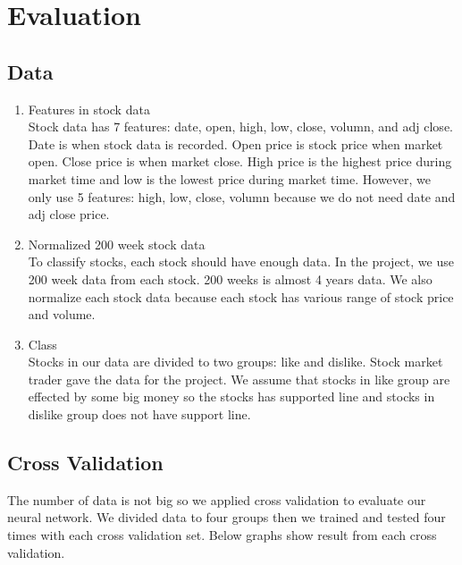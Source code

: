 \documentclass[12pt]{article}
\begin{document}
\section{Evaluation}
\subsection{Data}
\begin{enumerate}
	\item Features in stock data\\
		Stock data has 7 features: date, open, high, low, close, volumn, and adj close. Date is when stock data is recorded. Open price is stock price when market open. Close price is when market close. High price is the highest price during market time and low is the lowest price during market time. However, we only use 5 features: high, low, close, volumn because we do not need date and adj close price.

	\item Normalized 200 week stock data\\
		To classify stocks, each stock should have enough data. In the project, we use 200 week data from each stock. 200 weeks is almost 4 years data. We also normalize each stock data because each stock has various range of stock price and volume.

	\item Class\\
		Stocks in our data are divided to two groups: like and dislike. Stock market trader gave the data for the project. We assume that stocks in like group are effected by some big money so the stocks has supported line and stocks in dislike group does not have support line.
\end{enumerate}

\subsection{Cross Validation}
The number of data is not big so we applied cross validation to evaluate our neural network. We divided data to four groups then we trained and tested four times with each cross validation set. Below graphs show result from each cross validation.
\end{document}
